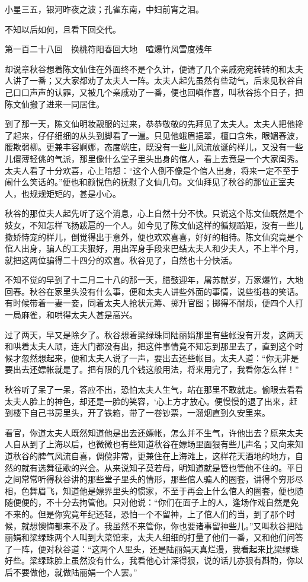 \documentclass[12pt,UTF8]{ctexbook}
\begin{document}
{{{小星三五，银河昨夜之波；孔雀东南，中妇前宵之泪。

不知以后如何，且看下回交代。





第一百二十八回　换桃符阳春回大地　喧爆竹风雪度残年





却说章秋谷想着陈文仙住在外面终不是个久计，便请了几个亲戚宛宛转转的和太夫人讲了一番；又大家都劝了太夫人一阵。太夫人起先虽然有些动气，后来见秋谷自己口口声声的认罪，又被几个亲戚劝了一番，便也回嗔作喜，叫秋谷拣个日子，把陈文仙搬了进来一同居住。

到了那一天，陈文仙明妆靓服的过来，恭恭敬敬的先拜见了太夫人。太夫人把他搀了起来，仔仔细细的从头到脚看了一遍。只见他蛾眉挹翠，檀口含朱，眼媚春波，腰欺弱柳。更兼丰容婀娜，态度端庄，既没有一些儿风流放诞的样儿，又没有一些儿儇薄轻佻的气派，那里像什么堂子里头出身的倌人，看上去竟是一个大家闺秀。太夫人看了十分欢喜，心上暗想：“这个人倒不像是个倌人出身，将来一定不至于闹什么笑话的。”便也和颜悦色的抚慰了文仙几句。文仙拜见了秋谷的那位正室夫人，也规规矩矩的，甚是小心。

秋谷的那位夫人起先听了这个消息，心上自然十分不快。只说这个陈文仙既然是个妓女，不知怎样飞扬跋扈的一个人。如今见了陈文仙这样的循规蹈矩，没有一些儿撒娇恃宠的样儿，倒觉得出于意外，便也欢欢喜喜，好好的相待。陈文仙究竟是个倌人出身，骗人的工夫狠好，用出浑身手段来巴结太夫人和少夫人，不上半个月，就把这两位骗得二十四分的欢喜。秋谷见了，自然也十分快活。

不知不觉的早到了十二月二十八的那一天，腊鼓迎年，屠苏献岁，万家爆竹，大地回春。秋谷在家里头没有什么事，便和太夫人讲些外面的事情，说些街巷的笑话。有时候带着一妻一妾，同着太夫人抢状元筹、掷升官图；掷得不耐烦，便四个人打一局麻雀，和哄得太夫人甚是高兴。

过了两天，早又是除夕了。秋谷想着梁绿珠同陆丽娟那里有些帐没有开发，这两天和哄着太夫人顽，连大门都没有出，把这件事情竟不知忘到那里去了，直到这个时候才忽然想起来，便和太夫人说了一声，要出去还些帐目。太夫人道：“你无非是要出去还嫖帐就是了。把有限的几个钱这般用法，将来用完了，我看你怎么样！”

秋谷听了呆了一呆，答应不出，恐怕太夫人生气，站在那里不敢就走。偷眼去看看太夫人脸上的神色，却还是一脸的笑容，‘心上方才放心。便慢慢的退了出来，赶到楼下自己书房里头，开了铁箱，带了一卷钞票，一溜烟直到久安里来。

看官，你道太夫人既然知道他是出去还嫖帐，怎么并不生气，许他出去？原来太夫人自从到了上海以后，也微微也有些知道秋谷在嫖场里面狠有些儿声名；又向来知道秋谷的脾气风流自喜，倜傥非常，更兼住在上海滩上，这样花天酒地的地方，自然的就有选舞征歌的兴会。从来说知子莫若母，明知道就是管也管他不住的。平日之间常常听得秋谷讲的那些堂子里头的情形，那些倌人骗人的圈套，讲得个穷形尽相，色舞眉飞，知道他是嫖界里头的惯家，不至于再会上什么倌人的圈套，便也随随便便的，不十分去拘管他。只对他说：“你们在面子上的人，逢场作戏自然是免不来的。但是你究竟年纪还轻，恐怕一个不留神，上了倌人们的当，到了那个时候，就想懊悔都来不及了。我虽然不来管你，你也要诸事留神些儿。”又叫秋谷把陆丽娟和梁绿珠两个人叫到大菜馆来，太夫人细细的打量了他们一番，又和他们问答了一阵，便对秋谷道：“这两个人里头，还是陆丽娟天真烂漫，我看起来比梁绿珠好些。梁绿珠脸上虽然没有什么，我看他心计深得狠，说的话儿亦狠有斟酌，你以后不要做他，就做陆丽娟一个人罢。”

}}}
\end{document}
